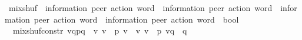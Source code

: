 \begin{isabellebody}
\isadelimdocument
%
\endisadelimdocument
%
\isatagdocument
%
\isamarkuptrue%
%
\endisatagdocument
{\isafolddocument}%
%
\isadelimdocument
%
\endisadelimdocument
{}\isamarkupfalse%
\ mix{\isacharunderscore}{\kern0pt}shuf\ {\isacharcolon}{\kern0pt}{\isacharcolon}{\kern0pt}\ {\isachardoublequoteopen}{\isacharparenleft}{\kern0pt}{\isacharprime}{\kern0pt}information{\isacharcomma}{\kern0pt}\ {\isacharprime}{\kern0pt}peer{\isacharparenright}{\kern0pt}\ action\ word\ {\isasymRightarrow}\ {\isacharparenleft}{\kern0pt}{\isacharprime}{\kern0pt}information{\isacharcomma}{\kern0pt}\ {\isacharprime}{\kern0pt}peer{\isacharparenright}{\kern0pt}\ action\ word\ {\isasymRightarrow}\ {\isacharparenleft}{\kern0pt}{\isacharprime}{\kern0pt}information{\isacharcomma}{\kern0pt}\ {\isacharprime}{\kern0pt}peer{\isacharparenright}{\kern0pt}\ action\ word\ {\isasymRightarrow}\ {\isacharparenleft}{\kern0pt}{\isacharprime}{\kern0pt}information{\isacharcomma}{\kern0pt}\ {\isacharprime}{\kern0pt}peer{\isacharparenright}{\kern0pt}\ action\ word\ {\isasymRightarrow}\ bool{\isachardoublequoteclose}\ \ \ \isanewline
\ \ mix{\isacharunderscore}{\kern0pt}shuf{\isacharunderscore}{\kern0pt}constr{\isacharcolon}{\kern0pt}\ {\isachardoublequoteopen}{\isasymlbrakk}vq{\isasymdown}\isactrlsub {\isacharbang}{\kern0pt}{\isasymdown}\isactrlsub {\isacharbraceleft}{\kern0pt}\isactrlsub p\isactrlsub {\isacharcomma}{\kern0pt}\isactrlsub q\isactrlsub {\isacharbraceright}{\kern0pt}{\isasymdown}\isactrlsub {\isacharbang}{\kern0pt}\isactrlsub {\isacharquery}{\kern0pt}\ {\isacharequal}{\kern0pt}\ v{\isasymdown}\isactrlsub {\isacharquery}{\kern0pt}{\isasymdown}\isactrlsub {\isacharbang}{\kern0pt}\isactrlsub {\isacharquery}{\kern0pt}{\isacharsemicolon}{\kern0pt}\ v{\isacharprime}{\kern0pt}\ {\isasymin}\ {\isasymL}\isactrlsup {\isacharasterisk}{\kern0pt}\isactrlsub {\isasymsqunion}\isactrlsub {\isasymsqunion}{\isacharparenleft}{\kern0pt}p{\isacharparenright}{\kern0pt}{\isacharsemicolon}{\kern0pt}\ v{\isacharprime}{\kern0pt}\ {\isasymsqunion}{\isasymsqunion}\isactrlsub {\isacharquery}{\kern0pt}\ v{\isacharsemicolon}{\kern0pt}\ v\ {\isasymin}\ {\isasymL}\isactrlsup {\isacharasterisk}{\kern0pt}{\isacharparenleft}{\kern0pt}p{\isacharparenright}{\kern0pt}{\isacharsemicolon}{\kern0pt}\ vq\ {\isasymin}\ {\isasymL}\isactrlsup {\isacharasterisk}{\kern0pt}{\isacharparenleft}{\kern0pt}q{\isacharparenright}{\kern0pt}{\isacharsemicolon}{\kern0pt}\ \isanewline

\end{isabellebody}
